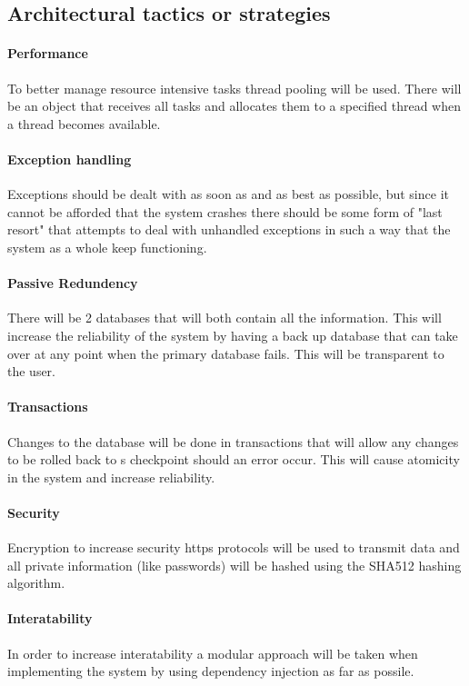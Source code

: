 \documentclass[english]{article}
\begin{document}
		\subsection{Architectural tactics or strategies}
			\paragraph{Performance}\indent
			To better manage resource intensive tasks thread pooling will be used. There will be an object that receives all tasks and allocates them to a specified thread when a thread becomes available.
			
			\paragraph{Exception handling}\indent
			Exceptions should be dealt with as soon as and as best as possible, but since it cannot be afforded that the system crashes there should be some form of "last resort" that attempts to deal with unhandled exceptions in such a way that the system as a whole keep functioning.
			
			\paragraph{Passive Redundency}\indent
			There will be 2 databases that will both contain all the information. This will increase the reliability of the system by having a back up database that can take over at any point when the primary database fails. This will be transparent to the user.
			
			\paragraph{Transactions}\indent
			Changes to the database will be done in transactions that will allow any changes to be rolled back to s checkpoint should an error occur. This will cause atomicity in the system and increase reliability.
			
			\paragraph{Security}\indent
			Encryption to increase security https protocols will be used to transmit data and all private information (like passwords) will be hashed using the SHA512 hashing algorithm.
			
			\paragraph{Interatability}\indent
			In order to increase interatability a modular approach will be taken when implementing the system by using dependency injection as far as possile.
			
\end{document}
